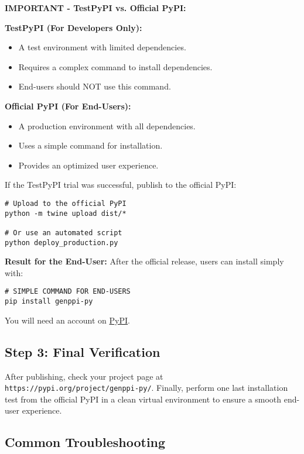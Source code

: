 \documentclass[11pt, a4paper]{article}
\begin{document}
\textbf{IMPORTANT - TestPyPI vs. Official PyPI:}

\textbf{TestPyPI (For Developers Only):}
\begin{itemize}
    \item A test environment with limited dependencies.
    \item Requires a complex command to install dependencies.
    \item End-users should NOT use this command.
\end{itemize}

\textbf{Official PyPI (For End-Users):}
\begin{itemize}
    \item A production environment with all dependencies.
    \item Uses a simple command for installation.
    \item Provides an optimized user experience.
\end{itemize}

If the TestPyPI trial was successful, publish to the official PyPI:
\begin{lstlisting}[style=bashstyle]
# Upload to the official PyPI
python -m twine upload dist/*

# Or use an automated script
python deploy_production.py
\end{lstlisting}

\textbf{Result for the End-User:}
After the official release, users can install simply with:
\begin{lstlisting}[style=bashstyle]
# SIMPLE COMMAND FOR END-USERS
pip install genppi-py
\end{lstlisting}

You will need an account on \href{https://pypi.org/}{PyPI}.

\subsection{Step 3: Final Verification}
After publishing, check your project page at \texttt{https://pypi.org/project/genppi-py/}. Finally, perform one last installation test from the official PyPI in a clean virtual environment to ensure a smooth end-user experience.

\subsection{Common Troubleshooting}
\end{document}
